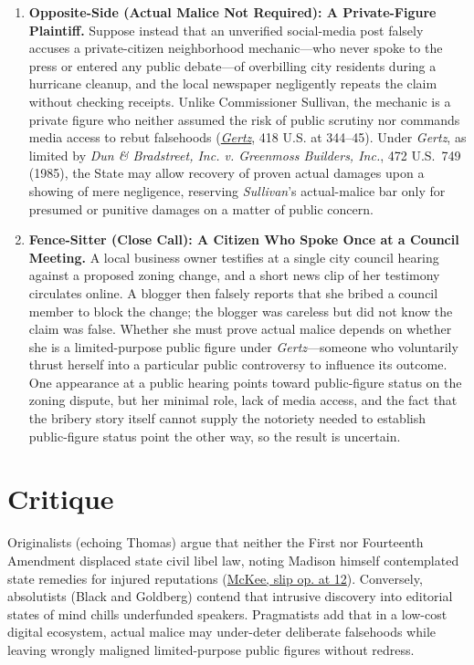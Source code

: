 \documentclass[12pt]{article}
\begin{document}
\begin{enumerate}
\item \textbf{Opposite-Side (Actual Malice Not Required): A Private-Figure Plaintiff.} Suppose instead that an unverified social-media post falsely accuses a private-citizen neighborhood mechanic---who never spoke to the press or entered any public debate---of overbilling city residents during a hurricane cleanup, and the local newspaper negligently repeats the claim without checking receipts. Unlike Commissioner Sullivan, the mechanic is a private figure who neither assumed the risk of public scrutiny nor commands media access to rebut falsehoods (\textit{\href{https://supreme.justia.com/cases/federal/us/418/323/}{Gertz}}, 418 U.S. at 344--45). Under \textit{Gertz}, as limited by \textit{Dun \& Bradstreet, Inc. v. Greenmoss Builders, Inc.}, 472 U.S.\ 749 (1985), the State may allow recovery of proven actual damages upon a showing of mere negligence, reserving \textit{Sullivan}'s actual-malice bar only for presumed or punitive damages on a matter of public concern.

\item \textbf{Fence-Sitter (Close Call): A Citizen Who Spoke Once at a Council Meeting.} A local business owner testifies at a single city council hearing against a proposed zoning change, and a short news clip of her testimony circulates online. A blogger then falsely reports that she bribed a council member to block the change; the blogger was careless but did not know the claim was false. Whether she must prove actual malice depends on whether she is a limited-purpose public figure under \textit{Gertz}---someone who voluntarily thrust herself into a particular public controversy to influence its outcome. One appearance at a public hearing points toward public-figure status on the zoning dispute, but her minimal role, lack of media access, and the fact that the bribery story itself cannot supply the notoriety needed to establish public-figure status point the other way, so the result is uncertain.

\end{enumerate}

\section{Critique}
Originalists (echoing Thomas) argue that neither the First nor Fourteenth Amendment displaced state civil libel law, noting Madison himself contemplated state remedies for injured reputations (\href{https://www.supremecourt.gov/opinions/18pdf/17-1542_ihdk.pdf}{McKee, slip op. at 12}). Conversely, absolutists (Black and Goldberg) contend that intrusive discovery into editorial states of mind chills underfunded speakers. Pragmatists add that in a low-cost digital ecosystem, actual malice may under-deter deliberate falsehoods while leaving wrongly maligned limited-purpose public figures without redress.
\end{document}
